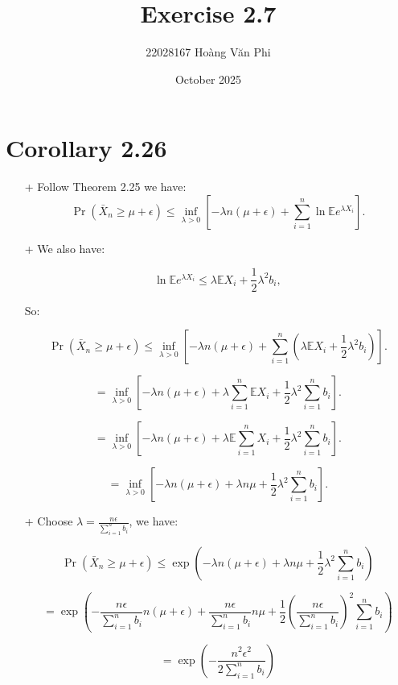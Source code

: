 \documentclass{article}
\title{Exercise 2.7}
\author{22028167 Hoàng Văn Phi}
\date{October 2025}
\begin{document}
\maketitle

\section{Corollary 2.26}

\begin{itemize}
    \item[+] Follow Theorem 2.25 we have:
    \[
    \Pr(\bar{X}_n \geq \mu + \epsilon) \leq \inf_{\lambda>0} 
    \left[ -\lambda n(\mu + \epsilon) + \sum_{i=1}^n \ln \mathbb{E} e^{\lambda X_i} \right].
    \]

    \item[+] We also have: 
    
    \[
    \ln \mathbb{E} e^{\lambda X_i} \leq \lambda \mathbb{E} X_i + \frac{1}{2} \lambda^2 b_i,
    \]
    
    So:

    \[
    \Pr(\bar{X}_n \geq \mu + \epsilon) \leq \inf_{\lambda>0} 
    \left[ -\lambda n(\mu + \epsilon) + \sum_{i=1}^n (\lambda \mathbb{E} X_i + \frac{1}{2} \lambda^2 b_i) \right].
    \]

    \[
    = \inf_{\lambda>0} 
    \left[ -\lambda n(\mu + \epsilon) + \lambda \sum_{i=1}^n  \mathbb{E} X_i + \frac{1}{2} \lambda^2 \sum_{i=1}^n b_i \right].
    \]

    \[
    = \inf_{\lambda>0} 
    \left[ -\lambda n(\mu + \epsilon) + \lambda \mathbb{E} \sum_{i=1}^n X_i + \frac{1}{2} \lambda^2 \sum_{i=1}^nb_i \right].
    \]

    \[
    = \inf_{\lambda>0} 
    \left[ -\lambda n(\mu + \epsilon) + \lambda n \mu + \frac{1}{2} \lambda^2 \sum_{i = 1}^{n} b_i \right].
    \]
    
    \item[+] Choose $\lambda = \frac{n\epsilon}{\sum_{i = 1}^{n}b_i}$, we have:

    
    \[
    \Pr(\bar{X}_n \geq \mu + \epsilon) \leq \exp(-\lambda n(\mu + \epsilon) + \lambda n \mu + \frac{1}{2} \lambda^2 \sum_{i=1}^n b_i)
    \]

     \[
    = \exp(-\frac{n\epsilon}{\sum_{i = 1}^{n}b_i} n(\mu + \epsilon) + \frac{n\epsilon}{\sum_{i = 1}^{n}b_i} n \mu + \frac{1}{2} (\frac{n\epsilon}{\sum_{i = 1}^{n}b_i})^2 \sum_{i=1}^n b_i)
    \]

    \[
    = \exp( -\frac{n^2\epsilon^2}{2\sum_{i = 1}^{n}b_i})
    \]

    
\end{itemize}
\end{document}
